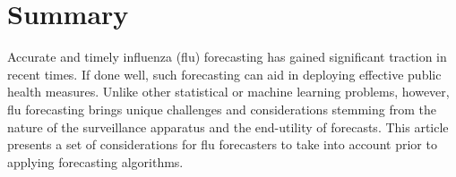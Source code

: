 \documentclass[10pt,letterpaper]{article}
\newcommand{\narenc}[1]{{\color{black}\textrm{#1}}}
\begin{document}
\section*{Summary}
Accurate and timely influenza (flu) forecasting has gained significant traction
in recent times. If done well, such forecasting can aid in deploying effective
public health measures. Unlike other statistical or machine learning problems,
however, flu forecasting brings unique challenges and considerations stemming
from the nature of the surveillance apparatus and the end-utility of forecasts.
\narenc{This article presents a set of considerations for flu forecasters to take into account
prior to applying forecasting algorithms.}
\fi
\linenumbers

\end{document}
